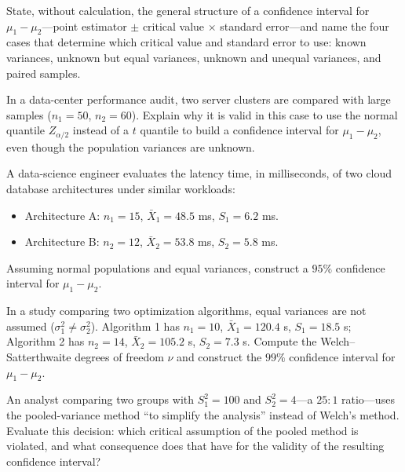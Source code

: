 \begin{problema}\label{prob:3988afe}
State, without calculation, the general structure of a confidence interval for $\mu_1-\mu_2$---point estimator $\pm$ critical value $\times$ standard error---and name the four cases that determine which critical value and standard error to use: known variances, unknown but equal variances, unknown and unequal variances, and paired samples.
\end{problema}

\begin{problema}\label{prob:7eaa452}
In a data-center performance audit, two server clusters are compared with large samples ($n_1=50$, $n_2=60$). Explain why it is valid in this case to use the normal quantile $Z_{\alpha/2}$ instead of a $t$ quantile to build a confidence interval for $\mu_1-\mu_2$, even though the population variances are unknown.
\end{problema}

\begin{problema}\label{prob:f1e6f4b}
A data-science engineer evaluates the latency time, in milliseconds, of two cloud database architectures under similar workloads:
\begin{itemize}
	\item Architecture A: $n_1=15$, $\bar X_1=48.5$ ms, $S_1=6.2$ ms.
	\item Architecture B: $n_2=12$, $\bar X_2=53.8$ ms, $S_2=5.8$ ms.
\end{itemize}
Assuming normal populations and equal variances, construct a $95\%$ confidence interval for $\mu_1-\mu_2$.
\end{problema}

\begin{problema}\label{prob:51e0d64}
In a study comparing two optimization algorithms, equal variances are not assumed ($\sigma_1^2\ne\sigma_2^2$). Algorithm 1 has $n_1=10$, $\bar X_1=120.4$ s, $S_1=18.5$ s; Algorithm 2 has $n_2=14$, $\bar X_2=105.2$ s, $S_2=7.3$ s. Compute the Welch--Satterthwaite degrees of freedom $\nu$ and construct the $99\%$ confidence interval for $\mu_1-\mu_2$.
\end{problema}

\begin{problema}\label{prob:4b6b800}
An analyst comparing two groups with $S_1^2=100$ and $S_2^2=4$---a $25{:}1$ ratio---uses the pooled-variance method ``to simplify the analysis'' instead of Welch's method. Evaluate this decision: which critical assumption of the pooled method is violated, and what consequence does that have for the validity of the resulting confidence interval?
\end{problema}


